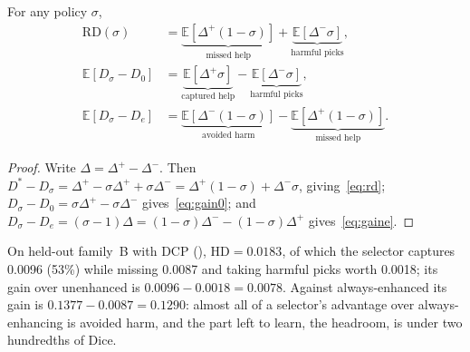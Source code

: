 \documentclass{midl}
\begin{document}
\begin{proposition}\label{prop:regret}
For any policy $\sigma$,
\begin{align}
\mathrm{RD}(\sigma)&=\underbrace{\mathbb{E}[\Delta^{+}(1-\sigma)]}_{\text{missed help}}+\underbrace{\mathbb{E}[\Delta^{-}\sigma]}_{\text{harmful picks}},\label{eq:rd}\\
\mathbb{E}[D_\sigma-D_0]&=\underbrace{\mathbb{E}[\Delta^{+}\sigma]}_{\text{captured help}}-\underbrace{\mathbb{E}[\Delta^{-}\sigma]}_{\text{harmful picks}},\label{eq:gain0}\\
\mathbb{E}[D_\sigma-D_e]&=\underbrace{\mathbb{E}[\Delta^{-}(1-\sigma)]}_{\text{avoided harm}}-\underbrace{\mathbb{E}[\Delta^{+}(1-\sigma)]}_{\text{missed help}}.\label{eq:gaine}
\end{align}
\end{proposition}
\begin{proof}
Write $\Delta=\Delta^{+}-\Delta^{-}$. Then $D^{*}-D_\sigma=\Delta^{+}-\sigma\Delta^{+}+\sigma\Delta^{-}=\Delta^{+}(1-\sigma)+\Delta^{-}\sigma$, giving~\eqref{eq:rd}; $D_\sigma-D_0=\sigma\Delta^{+}-\sigma\Delta^{-}$ gives~\eqref{eq:gain0}; and $D_\sigma-D_e=(\sigma-1)\Delta=(1-\sigma)\Delta^{-}-(1-\sigma)\Delta^{+}$ gives~\eqref{eq:gaine}.
\end{proof}
\noindent On held-out family~B with DCP (), $\mathrm{HD}=0.0183$, of which the selector captures 0.0096 (53\%) while missing 0.0087 and taking harmful picks worth 0.0018; its gain over unenhanced is $0.0096-0.0018=0.0078$. Against always-enhanced its gain is $0.1377-0.0087=0.1290$: almost all of a selector's advantage over always-enhancing is avoided harm, and the part left to learn, the headroom, is under two hundredths of Dice.
\end{document}
